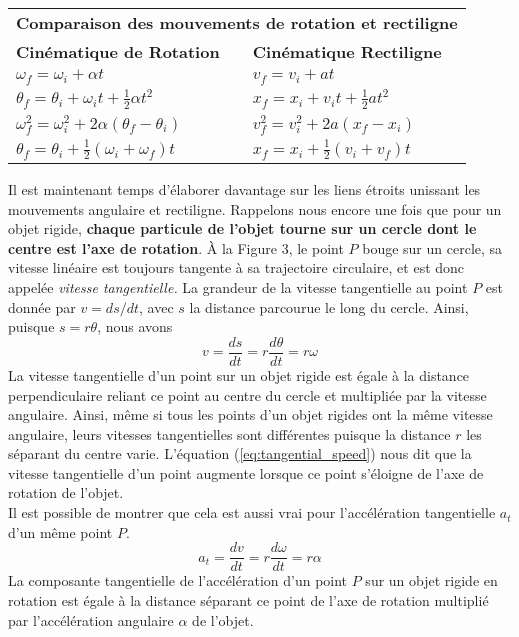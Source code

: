 \documentclass[titlepage,oneside,a4paper,11pt]{book} %
\begin{document}
\begin{table}[]
\centering
\begin{tabular}{ll}
\multicolumn{2}{c}{\cellcolor[HTML]{C0C0C0}{\color[HTML]{3166FF} }\textbf{Comparaison des mouvements de rotation et rectiligne}} \\
 \textbf{Cinématique de Rotation} & \textbf{Cinématique Rectiligne}  \\ \hline
 $\omega_f=\omega_i+\alpha t $&  $ v_{f}=v_{i}+a t  $ \\
 $\theta_{f}=\theta_{i}+\omega_{i} t+\frac{1}{2} \alpha t^{2}$ &$x_{f}=x_{i}+v_{i} t+\frac{1}{2} a t^{2}$ \\
 $\omega_{f}^{2}=\omega_{i}^{2}+2 \alpha\left(\theta_{f}-\theta_{i}\right) $&   $ v_{f}^{2}=v_{i}^{2}+2 a\left(x_{f}-x_{i}\right)$\\
 $\theta_{f}=\theta_{i}+\frac{1}{2}\left(\omega_{i}+\omega_{f}\right) t $& $ x_{f}=x_{i}+\frac{1}{2}\left(v_{i}+v_{f}\right) t$\\
                               
\end{tabular}
\end{table}
Il est maintenant temps d'élaborer davantage sur les liens étroits unissant les mouvements angulaire et rectiligne. Rappelons nous encore une fois que pour un objet rigide, \textbf{chaque particule de l'objet tourne sur un cercle dont le centre est l'axe de rotation}. À la Figure 3, le point $P$ bouge sur un cercle, sa vitesse linéaire est toujours tangente à sa trajectoire circulaire, et est donc appelée \emph{vitesse tangentielle.} La grandeur de la vitesse tangentielle au point $P$ est donnée par $v=ds/dt$, avec $s$ la distance parcourue le long du cercle. Ainsi, puisque $s=r\theta$, nous avons
\begin{equation}
v = \frac{ds}{dt} = r\frac{d\theta}{dt} = r\omega
\label{eq:tangential_speed}
\end{equation}
La vitesse tangentielle d'un point sur un objet rigide est égale à la distance perpendiculaire reliant ce point au centre du cercle et multipliée par la vitesse angulaire. Ainsi, même si tous les points d'un objet rigides ont la même vitesse angulaire, leurs vitesses tangentielles sont différentes puisque la distance $r$ les séparant du centre varie. L'équation (\ref{eq:tangential_speed}) nous dit que la vitesse tangentielle d'un point augmente lorsque ce point s'éloigne de l'axe de rotation de l'objet.\\

Il est possible de montrer que cela est aussi vrai pour l'accélération tangentielle $a_t$ d'un même point $P$.
\begin{equation}
a_t = \frac{dv}{dt} = r\frac{d\omega}{dt} = r\alpha
\end{equation}
La composante tangentielle de l'accélération d'un point $P$ sur un objet rigide en rotation est égale à la distance séparant ce point de l'axe de rotation multiplié par l'accélération angulaire $\alpha$ de l'objet. \\
\end{document}
